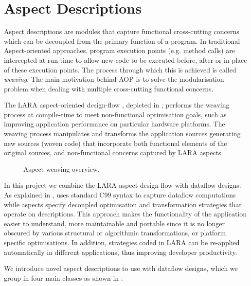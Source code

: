 \chapter{Aspect Descriptions}
\label{sec:aspects}

Aspect descriptions are modules that capture functional cross-cutting
concerns which can be decoupled from the primary function of a program. In
traditional Aspect-oriented approaches, program execution points
(e.g. method calls) are intercepted at run-time to allow new code to
be executed before, after or in place of these execution points. The
process through which this is achieved is called \emph{weaving}. The
main motivation behind AOP is to solve the modularisation problem when
dealing with multiple cross-cutting functional concerns.

The LARA aspect-oriented design-flow
\cite{Cardoso:Carvalho:Cutinho:Luk:Nobre:Diniz:Petrov:2012}, depicted
in , performs the weaving process at
compile-time to meet non-functional optimisation goals, such as
improving application performance on particular hardware
platforms. The weaving process manipulates and transforms the
application sources generating new sources (woven code) that
incorporate both functional elements of the original sources, and
non-functional concerns captured by LARA aspects.

\begin{figure}[!ht]
  \centering
  \def\svgwidth{\textwidth}
  
  \caption{Aspect weaving overview.}
  \label{fig:aspect-weaving}
\end{figure}
In this project we combine the LARA aspect design-flow with \FAST{}
dataflow designs. As explained in , \FAST{} uses
standard C99 syntax to capture dataflow computations while aspects
specify decoupled optimisation and transformation strategies that
operate on \FAST{} descriptions. This approach makes the functionality
of the application easier to understand, more maintainable and
portable since it is no longer obscured by various structural or
algorithmic transformations, or platform specific optimisations. In
addition, strategies coded in LARA can be re-applied automatically in
different applications, thus improving developer productivity.

We introduce novel aspect descriptions to use with \FAST{} dataflow
designs, which we group in four main classes as shown in
:

